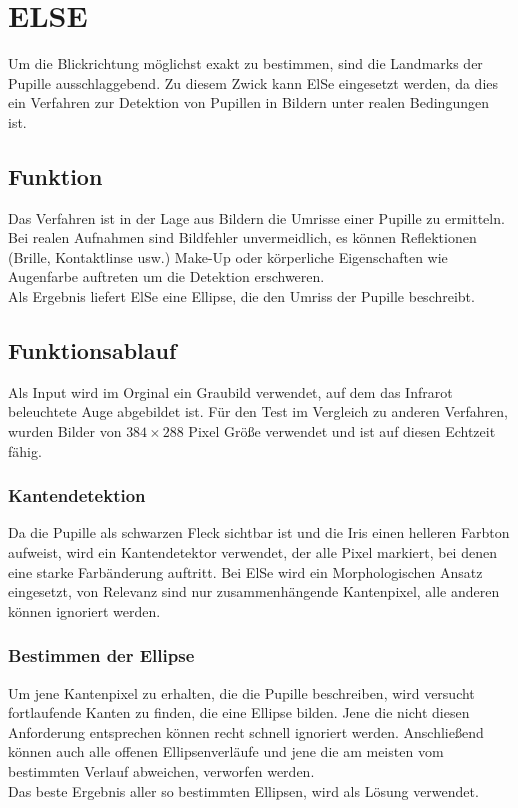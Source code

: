 \section{ELSE}
Um die Blickrichtung möglichst exakt zu bestimmen, sind die Landmarks der Pupille ausschlaggebend. Zu diesem Zwick kann ElSe eingesetzt werden, da dies ein Verfahren zur Detektion von Pupillen in Bildern unter realen Bedingungen ist.
\subsection{Funktion}
Das Verfahren ist in der Lage aus Bildern die Umrisse einer Pupille zu ermitteln. Bei realen Aufnahmen sind Bildfehler unvermeidlich, es können Reflektionen (Brille, Kontaktlinse usw.) Make-Up oder körperliche Eigenschaften wie Augenfarbe auftreten um die Detektion erschweren.\\
Als Ergebnis liefert ElSe eine Ellipse, die den Umriss der Pupille beschreibt.
\subsection{Funktionsablauf}
Als Input wird im Orginal ein Graubild verwendet, auf dem das Infrarot beleuchtete Auge abgebildet ist. Für den Test im Vergleich zu anderen Verfahren, wurden Bilder von $384\times 288$ Pixel Größe verwendet und ist auf diesen Echtzeit fähig.
\subsubsection{Kantendetektion}
Da die Pupille als schwarzen Fleck sichtbar ist und die Iris einen helleren Farbton aufweist, wird ein Kantendetektor verwendet, der alle Pixel markiert, bei denen eine starke Farbänderung auftritt. Bei ElSe wird ein Morphologischen Ansatz eingesetzt, von Relevanz sind nur zusammenhängende Kantenpixel, alle anderen können ignoriert werden.
\subsubsection{Bestimmen der Ellipse}
Um jene Kantenpixel zu erhalten, die die Pupille beschreiben, wird versucht fortlaufende Kanten zu finden, die eine Ellipse bilden. Jene die nicht diesen Anforderung entsprechen können recht schnell ignoriert werden. Anschließend können auch alle offenen Ellipsenverläufe und jene die am meisten vom bestimmten Verlauf abweichen, verworfen werden.\\
Das beste Ergebnis aller so bestimmten Ellipsen, wird als Lösung verwendet.
